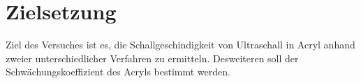 \section{Zielsetzung}
\label{sec:Zielsetzung}

Ziel des Versuches ist es, die Schallgeschindigkeit von Ultraschall in Acryl anhand zweier unterschiedlicher Verfahren zu 
ermitteln. Desweiteren soll der Schwächungskoeffizient des Acryls bestimmt werden.
